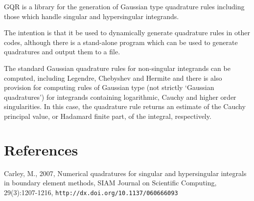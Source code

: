 GQR is a library for the generation of Gaussian type quadrature rules including those which handle singular and hypersingular integrands.

The intention is that it be used to dynamically generate quadrature rules in other codes, although there is a stand-\/alone program which can be used to generate quadratures and output them to a file.

The standard Gaussian quadrature rules for non-\/singular integrands can be computed, including Legendre, Chebyshev and Hermite and there is also provision for computing rules of Gaussian type (not strictly `Gaussian quadratures') for integrands containing logarithmic, Cauchy and higher order singularities. In this case, the quadrature rule returns an estimate of the Cauchy principal value, or Hadamard finite part, of the integral, respectively.\section{References}\label{index_references}

\begin{DoxyItemize}
\item Carley, M., 2007, Numerical quadratures for singular and hypersingular integrals in boundary element methods, SIAM Journal on Scientific Computing, 29(3):1207-\/1216, {\tt http://dx.doi.org/10.1137/060666093} 
\end{DoxyItemize}